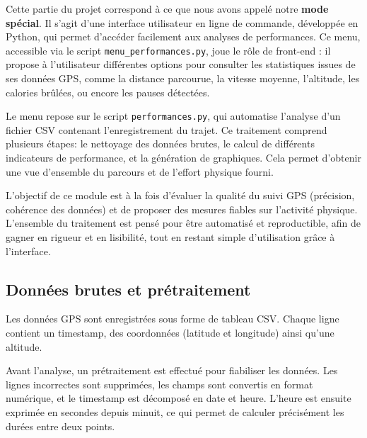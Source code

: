 

Cette partie du projet correspond à ce que nous avons appelé notre \textbf{mode spécial}. Il s’agit d’une interface utilisateur en ligne de commande, développée en Python, qui permet d’accéder facilement aux analyses de performances. Ce menu, accessible via le script \texttt{menu\_performances.py}, joue le rôle de front-end : il propose à l’utilisateur différentes options pour consulter les statistiques issues de ses données GPS, comme la distance parcourue, la vitesse moyenne, l’altitude, les calories brûlées, ou encore les pauses détectées.

\vspace{1em}

Le menu repose sur le script \texttt{performances.py}, qui automatise l’analyse d’un fichier CSV contenant l’enregistrement du trajet. Ce traitement comprend plusieurs étapes: le nettoyage des données brutes, le calcul de différents indicateurs de performance, et la génération de graphiques. Cela permet d’obtenir une vue d’ensemble du parcours et de l’effort physique fourni.

\vspace{1em}

L’objectif de ce module est à la fois d’évaluer la qualité du suivi GPS (précision, cohérence des données) et de proposer des mesures fiables sur l’activité physique. L’ensemble du traitement est pensé pour être automatisé et reproductible, afin de gagner en rigueur et en lisibilité, tout en restant simple d’utilisation grâce à l’interface.

\vspace{2em}

\subsection{Données brutes et prétraitement}

Les données GPS sont enregistrées sous forme de tableau CSV. Chaque ligne contient un timestamp, des coordonnées (latitude et longitude) ainsi qu’une altitude.

\vspace{1em}

Avant l’analyse, un prétraitement est effectué pour fiabiliser les données. Les lignes incorrectes sont supprimées, les champs sont convertis en format numérique, et le timestamp est décomposé en date et heure. L’heure est ensuite exprimée en secondes depuis minuit, ce qui permet de calculer précisément les durées entre deux points.

